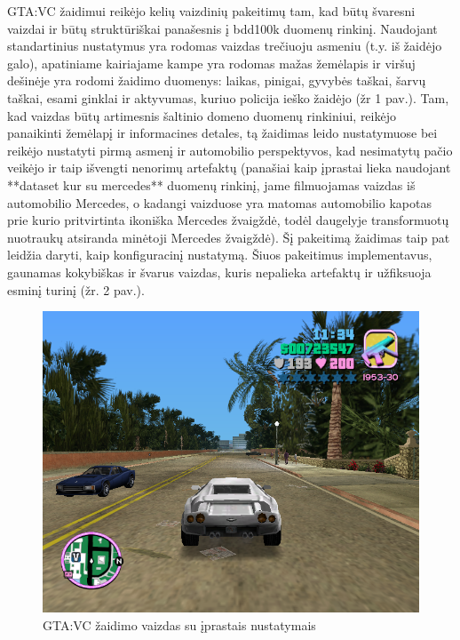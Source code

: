 \documentclass{VUMIFPSkursinis}
\begin{document}
GTA:VC žaidimui reikėjo kelių vaizdinių pakeitimų tam, kad būtų švaresni vaizdai ir būtų struktūriškai panašesnis į bdd100k duomenų rinkinį. Naudojant standartinius nustatymus yra rodomas vaizdas trečiuoju asmeniu (t.y. iš žaidėjo galo), apatiniame kairiajame kampe yra rodomas mažas žemėlapis ir viršuj dešinėje yra rodomi žaidimo duomenys: laikas, pinigai, gyvybės taškai, šarvų taškai, esami ginklai ir aktyvumas, kuriuo policija ieško žaidėjo (žr 1 pav.). Tam, kad vaizdas būtų artimesnis šaltinio domeno duomenų rinkiniui, reikėjo panaikinti žemėlapį ir informacines detales, tą žaidimas leido nustatymuose bei reikėjo nustatyti pirmą asmenį ir automobilio perspektyvos, kad nesimatytų pačio veikėjo ir taip išvengti nenorimų artefaktų (panašiai kaip įprastai lieka naudojant **dataset kur su mercedes** duomenų rinkinį, jame filmuojamas vaizdas iš automobilio Mercedes, o kadangi vaizduose yra matomas automobilio kapotas prie kurio pritvirtinta ikoniška Mercedes žvaigždė, todėl daugelyje transformuotų nuotraukų atsiranda minėtoji Mercedes žvaigždė). Šį pakeitimą žaidimas taip pat leidžia daryti, kaip konfiguracinį nustatymą. Šiuos pakeitimus implementavus, gaunamas kokybiškas ir švarus vaizdas, kuris nepalieka artefaktų ir užfiksuoja esminį turinį (žr. 2 pav.).
\begin{figure}[H]
    \centering
    \includegraphics[scale=0.5]{img/neapdorotas_pvz}
    \caption{GTA:VC žaidimo vaizdas su įprastais nustatymais}
    \label{img:mlp}
\end{figure}
\end{document}
